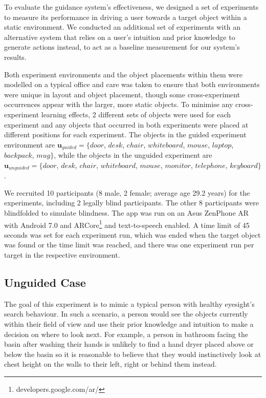 \documentclass[runningheads]{llncs}
\begin{document}
To evaluate the guidance system's effectiveness, we designed a set of experiments to measure its performance in driving a user towards a target object within a static environment. 
We conducted an additional set of experiments with an alternative system that relies on a user's intuition and prior knowledge to generate actions instead, to act as a baseline measurement for our system's results. 

Both experiment environments and the object placements within them were modelled on a typical office and care was taken to ensure that both environments were unique in layout and object placement, though some cross-experiment occurrences appear with the larger, more static objects. 
To minimise any cross-experiment learning effects, 2 different sets of objects were used for each experiment and any objects that occurred in both experiments were placed at different positions for each experiment. 
The objects in the guided experiment environment are $\mathbf{u}_{guided} = \{ door$, $desk$, $chair$, $whiteboard$, $mouse$, $laptop$, $backpack$, $mug \}$, while the objects in the unguided experiment are $\mathbf{u}_{unguided} = \{ door$, $desk$, $chair$, $whiteboard$, $mouse$, $monitor$, $telephone$, $keyboard \}$.

We recruited 10 participants (8 male, 2 female; average age 29.2 years) for the experiments, including 2 legally blind participants. 
The other 8 participants were blindfolded to simulate blindness. 
The app was run on an Asus ZenPhone AR with Android 7.0 and ARCore\footnote{developers.google.com/ar/} and text-to-speech enabled. 
A time limit of 45 seconds was set for each experiment run, which was ended when the target object was found or the time limit was reached, and there was one experiment run per target in the respective environment.

\subsection{Unguided Case}

The goal of this experiment is to mimic a typical person with healthy eyesight's search behaviour. 
In such a scenario, a person would see the objects currently within their field of view and use their prior knowledge and intuition to make a decision on where to look next.
For example, a person in bathroom facing the basin after washing their hands is unlikely to find a hand dryer placed above or below the basin so it is reasonable to believe that they would instinctively look at chest height on the walls to their left, right or behind them instead. 
\end{document}

